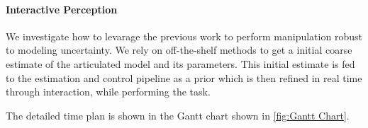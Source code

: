 \paragraph{Interactive Perception} We investigate how to levarage the previous work to perform manipulation robust to modeling uncertainty. We rely on off-the-shelf methods to get a initial coarse estimate of the articulated model and its parameters. This initial estimate is fed to the estimation and control pipeline as a prior which is then refined in real time through interaction, while performing the task. 

The detailed time plan is shown in the Gantt chart shown in \cref{fig:Gantt Chart}.


